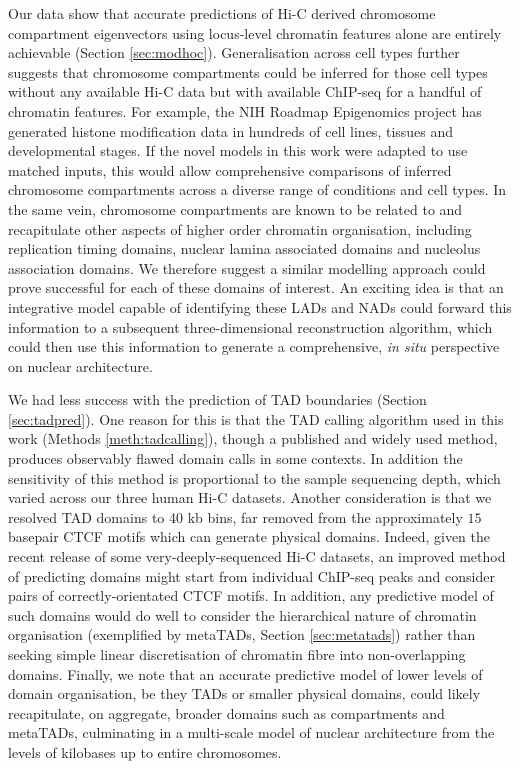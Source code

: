 \documentclass[a4paper,11pt,oneside]{book}
\begin{document}
Our data show that accurate predictions of Hi-C derived
chromosome compartment eigenvectors using locus-level chromatin features alone are entirely achievable (Section \ref{sec:modhoc}). Generalisation across cell types further suggests that chromosome compartments could be inferred for those cell types without any available Hi-C data but with available ChIP-seq for a handful of chromatin features. For example, the NIH Roadmap Epigenomics project has generated histone modification data in hundreds of cell lines, tissues and developmental stages.\cite{Bernstein2010, Kundaje2015} If the novel models in this work were adapted to use matched inputs, this would allow comprehensive comparisons of inferred chromosome compartments across a diverse range of conditions and cell types. In the same vein, chromosome compartments are known to be related to and recapitulate other aspects of higher order chromatin organisation, including replication timing domains, nuclear lamina associated domains and nucleolus association domains.\cite{Lieberman2009, Pombo2015, Bickmore2013} We therefore suggest a similar modelling approach could prove successful for each of these domains of interest. An exciting idea is that an integrative model capable of identifying these LADs and NADs could forward this information to a subsequent three-dimensional reconstruction algorithm, which could then use this information to generate a comprehensive, \emph{in situ} perspective on nuclear architecture.

We had less success with the prediction of TAD boundaries (Section \ref{sec:tadpred}). One reason for this is that the TAD calling algorithm used in this work\cite{Dixon2012} (Methods \ref{meth:tadcalling}), though a published and widely used method, produces observably flawed domain calls in some contexts. In addition the sensitivity of this method is proportional to the sample sequencing depth, which varied across our three human Hi-C datasets. Another consideration is that we resolved TAD domains to 40 kb bins, far removed from the approximately $15$ basepair CTCF motifs which can generate physical domains. Indeed, given the recent release of some very-deeply-sequenced Hi-C datasets,\cite{Rao2014} an improved method of predicting domains might start from individual ChIP-seq peaks and consider pairs of correctly-orientated CTCF motifs. In addition, any predictive model of such domains would do well to consider the hierarchical nature of chromatin organisation (exemplified by metaTADs, Section \ref{sec:metatads}) rather than seeking simple linear discretisation of chromatin fibre into non-overlapping domains. Finally, we note that an accurate predictive model of lower levels of domain organisation, be they TADs or smaller physical domains, could likely recapitulate, on aggregate, broader domains such as compartments and metaTADs, culminating in a multi-scale model of nuclear architecture from the levels of kilobases up to entire chromosomes.
\end{document}
